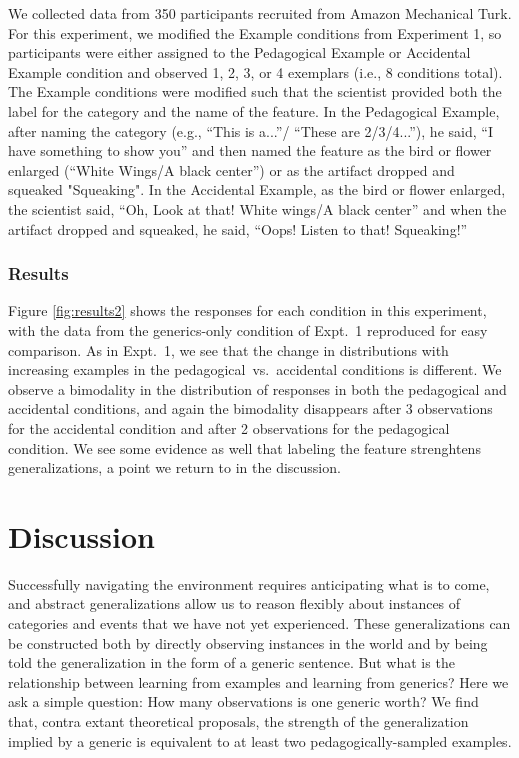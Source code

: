 \documentclass[10pt,letterpaper]{article}
\begin{document}
We collected data from 350 participants recruited from Amazon Mechanical Turk.
For this experiment, we modified the Example conditions from Experiment 1, so participants were either assigned to the Pedagogical Example or Accidental Example condition and observed 1, 2, 3, or 4 exemplars (i.e., 8 conditions total). The Example conditions were modified such that the scientist provided both the label for the category and the name of the feature. In the Pedagogical Example, after naming the category (e.g., ``This is a...''/ ``These are 2/3/4...''), he said, ``I have something to show you'' and then named the feature as the bird or flower enlarged (``White Wings/A black center'') or as the artifact dropped and squeaked "Squeaking".
In the Accidental Example, as the bird or flower enlarged, the scientist said, ``Oh, Look at that! White wings/A black center'' and when the artifact dropped and squeaked, he said, ``Oops! Listen to that! Squeaking!'' 

\subsubsection{Results}

Figure \ref{fig:results2} shows the responses for each condition in this experiment, with the data from the generics-only condition of Expt.~1 reproduced for easy comparison. 
As in Expt.~1, we see that the change in distributions with increasing examples in the pedagogical~vs.~accidental conditions is different. We observe a bimodality in the distribution of responses in both the pedagogical and accidental conditions, and again the bimodality disappears after 3 observations for the accidental condition and after 2 observations for the pedagogical condition. We see some evidence as well that labeling the feature strenghtens generalizations, a point we return to in the discussion.

\section{Discussion}

Successfully navigating the environment requires anticipating what is to come, and abstract generalizations allow us to reason flexibly about instances of categories and events that we have not yet experienced. 
These generalizations can be constructed both by directly observing instances in the world and by being told the generalization in the form of a generic sentence. 
But what is the relationship between learning from examples and learning from generics? 
Here we ask a simple question: How many observations is one generic worth?
We find that, contra extant theoretical proposals, the strength of the generalization implied by a generic is equivalent to at least two pedagogically-sampled examples. 
\end{document}
